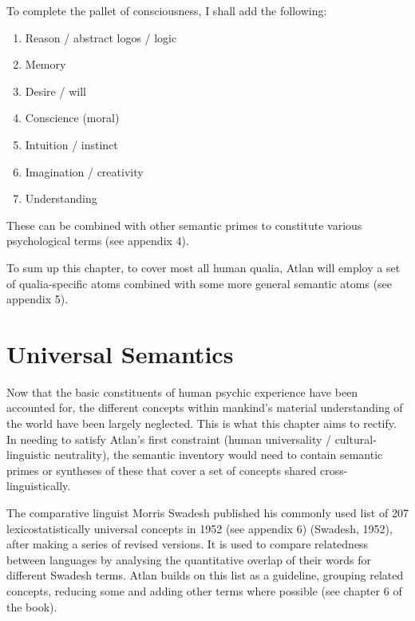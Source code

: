 \noindent To complete the pallet of consciousness, I shall add the following: 
\setcounter{enumi}{9}
\begin{enumerate}
\item   Reason / abstract logos / logic 

\item   Memory 

\item   Desire / will 

\item   Conscience (moral) 

\item   Intuition / instinct 

\item   Imagination / creativity 

\item   Understanding
\end{enumerate}

\noindent These can be combined with other semantic primes to constitute various psychological terms (see appendix 4).  

To sum up this chapter, to cover most all human qualia, Atlan will employ a set of qualia-specific atoms combined with some more general semantic atoms (see appendix 5).

\section{Universal Semantics}

Now that the basic constituents of human psychic experience have been accounted for, the different concepts within mankind’s material understanding of the world have been largely neglected. This is what this chapter aims to rectify. In needing to satisfy Atlan’s first constraint (human universality / cultural-linguistic neutrality), the semantic inventory would need to contain semantic primes or syntheses of these that cover a set of concepts shared cross-linguistically.  

The comparative linguist Morris Swadesh published his commonly used list of 207 lexicostatistically universal concepts in 1952 (see appendix 6) (Swadesh, 1952), after making a series of revised versions. It is used to compare relatedness between languages by analysing the quantitative overlap of their words for different Swadesh terms. Atlan builds on this list as a guideline, grouping related concepts, reducing some and adding other terms where possible (see chapter 6 of the book). 

